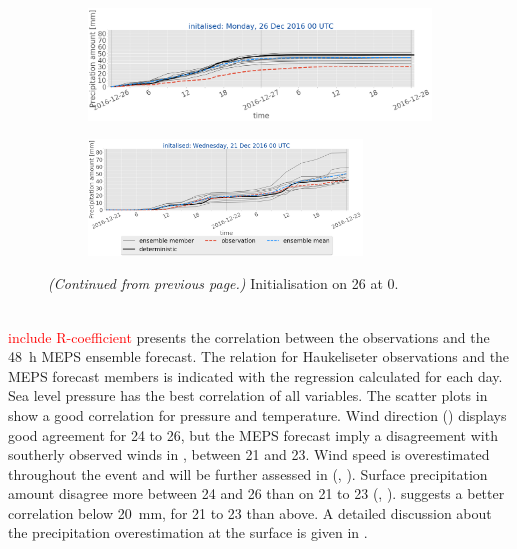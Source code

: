 \begin{figure}[H]
	\begin{subfigure}[b]{0.75\textwidth}
		\includegraphics[trim={0.cm 1.5cm 0cm 0cm},clip,
		width=\textwidth]{./fig_sfc_precip/20161226_00}
		\caption{}\label{fig:res:sfc_precip26}
	\end{subfigure}
	\begin{subfigure}[b]{0.8\textwidth}
		\centering
		\includegraphics[trim={5.5cm 0cm 5.cm 17.7cm},clip,
		width=0.8\textwidth]{./fig_sfc_precip/20161221_00_label}
	\end{subfigure}
    \caption{\textit{(Continued from previous page.)} Initialisation on \SI{26}{\dec} at \SI{0}{\UTC}.}
\end{figure}
\noindent
\\
\textcolor{red}{include R-coefficient}
 presents the correlation between the observations and the \SI{48}{\hour} MEPS ensemble forecast. The relation for Haukeliseter observations and the MEPS forecast members is indicated with the regression calculated for each day. Sea level pressure has the best correlation of  all variables. The scatter plots in  show a good correlation for pressure and temperature. Wind direction () displays good agreement for \num{24} to \SI{26}{\dec}, but the MEPS forecast imply a disagreement with southerly observed winds in , between \num{21} and \SI{23}{\dec}. Wind speed is overestimated throughout the event and will be further assessed in  (, ). Surface precipitation amount disagree more between \num{24} and \SI{26}{\dec} than on \num{21} to \SI{23}{\dec} (, ).  suggests a better correlation below \SI{20}{\mm}, for \num{21} to \SI{23}{\dec} than above. A detailed discussion about the precipitation overestimation at the surface is given in .

